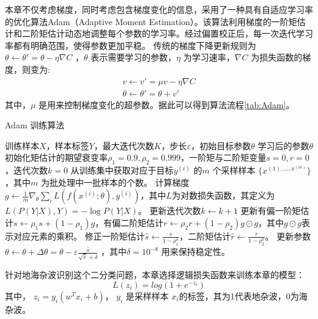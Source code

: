 本章不仅考虑梯度，同时考虑包含梯度变化的信息，采用了一种具有自适应学习率的优化算法Adam（Adaptive Moment Estimation）。该算法利用梯度的一阶矩估计和二阶矩估计动态地调整每个参数的学习率。经过偏置校正后，每一次迭代学习率都有明确范围，使得参数更加平稳。
传统的梯度下降更新规则为$\theta \leftarrow \theta'=\theta-\eta\nabla C$ ，$\theta$ 表示需要学习的参数，$\eta$ 为学习速率，$\nabla C$ 为损失函数的梯度，则变为:
\begin{align}
	v\leftarrow v'=\mu v - \eta \nabla C \\
	\theta \leftarrow \theta' = \theta +v'
\end{align}
其中，$\mu$ 是用来控制梯度变化的超参数。据此可以得到算法流程\ref{tab:Adam}。

\begin{algorithm}[hbt]
	\caption{Adam 训练算法}
	\label{tab:Adam}
	\begin{algorithmic}[1] %
		\Require 训练样本$X$，样本标签$Y$，最大迭代次数$K$，步长$\varepsilon$，初始目标参数$\theta$
		\Ensure 学习后的参数$\theta$
		\State 初始化矩估计的期望衰变率$\rho_1=0.9,\rho_2=0.999$，一阶矩与二阶矩变量$s=0,r=0$，迭代次数$k=0$
			\State 从训练集中获取对应于目标$y^{(i)}$ 的$m$ 个采样样本 $\{x^{(1),\dots,x^{(m)}}\}$ ，其中$m$ 为批处理中一批样本的个数。
			\label{line:start}
			\State 计算梯度$g \leftarrow \frac{1}{m} \nabla_{\theta} \sum_i L(f(x^{(i)};\theta), y^{(i)}) $，其中$L$为对数损失函数，其定义为$L(P(Y|X),Y) = - \log P(Y|X) $。
			\State 更新迭代次数$k \leftarrow k+1 $
			\State 更新有偏一阶矩估计$s \leftarrow \rho_1 s + (1 - \rho_1) g $，有偏二阶矩估计$r \leftarrow \rho_2 r + (1-\rho_2) g \odot g $，其中$ g \odot g $表示对应元素的乘积。
			\State 修正一阶矩估计$\hat{s} \leftarrow \frac{s}{1-\rho^k_1} $，二阶矩估计$\hat{r} \leftarrow \frac{r}{1-\rho^k_2} $。
			\State 更新参数 $\theta \leftarrow \theta + \Delta \theta = \theta - \varepsilon \frac{\hat{s}}{\sqrt{\hat{r}} + \delta} $
			，其中$\delta = 10^{-8} $
			用来保持稳定性。
		\EndWhile
	\end{algorithmic}
\end{algorithm}

针对地海杂波识别这个二分类问题，本章选择逻辑损失函数来训练本章的模型：
\begin{equation}
	L(z_i) = log(1+e^{-z_i})
\end{equation}
其中， $z_i=y_i(w^T x_i + b)$， $y_i$ 是采样样本 $x_i$的标签，其为1代表地杂波，0为海杂波。

